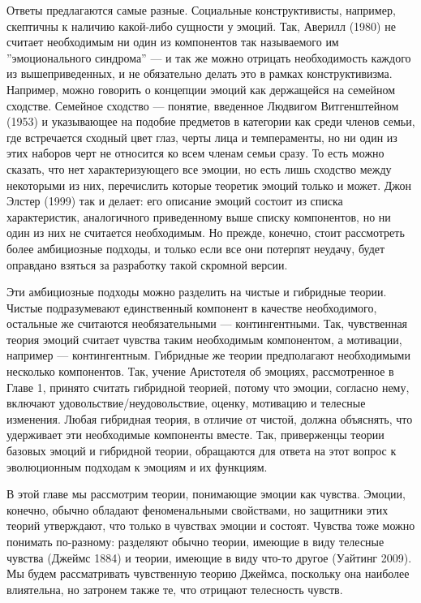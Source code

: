 \documentclass[11pt]{book}
\begin{document}
Ответы предлагаются самые разные. Социальные конструктивисты, например, скептичны к наличию какой-либо сущности у эмоций. Так, Аверилл (1980) не считает необходимым ни один из компонентов так называемого им ''эмоционального синдрома'' --- и так же можно отрицать необходимость каждого из вышеприведенных, и не обязательно делать это в рамках конструктивизма. Например, можно говорить о концепции эмоций как держащейся на семейном сходстве. Семейное сходство --- понятие, введенное Людвигом Витгенштейном (1953) и указывающее на подобие предметов в категории как среди членов семьи, где встречается сходный цвет глаз, черты лица и темпераменты, но ни один из этих наборов черт не относится ко всем членам семьи сразу. То есть можно сказать, что нет характеризующего все эмоции, но есть лишь сходство между некоторыми из них, перечислить которые теоретик эмоций только и может. Джон Элстер (1999) так и делает: его описание эмоций состоит из списка характеристик, аналогичного приведенному выше списку компонентов, но ни один из них не считается необходимым. Но прежде, конечно, стоит рассмотреть более амбициозные подходы, и только если все они потерпят неудачу, будет оправдано взяться за разработку такой скромной версии.

Эти амбициозные подходы можно разделить на чистые и гибридные теории. Чистые подразумевают единственный компонент в качестве необходимого, остальные же считаются необязательными --- контингентными. Так, чувственная теория эмоций считает чувства таким необходимым компонентом, а мотивации, например --- контингентным. Гибридные же теории предполагают необходимыми несколько компонентов. Так, учение Аристотеля об эмоциях, рассмотренное в Главе 1, принято считать гибридной теорией, потому что эмоции, согласно нему, включают удовольствие/неудовольствие, оценку, мотивацию и телесные изменения. Любая гибридная теория, в отличие от чистой, должна объяснять, что удерживает эти необходимые компоненты вместе. Так, приверженцы теории базовых эмоций и гибридной теории, обращаются для ответа на этот вопрос к эволюционным подходам к эмоциям и их функциям.

В этой главе мы рассмотрим теории, понимающие эмоции как чувства. Эмоции, конечно, обычно обладают феноменальными свойствами, но защитники этих теорий утверждают, что только в чувствах эмоции и состоят. Чувства тоже можно понимать по-разному: разделяют обычно теории, имеющие в виду телесные чувства (Джеймс 1884) и теории, имеющие в виду что-то другое (Уайтинг 2009). Мы будем рассматривать чувственную теорию Джеймса, поскольку она наиболее влиятельна, но затронем также те, что отрицают телесность чувств.
\end{document}
